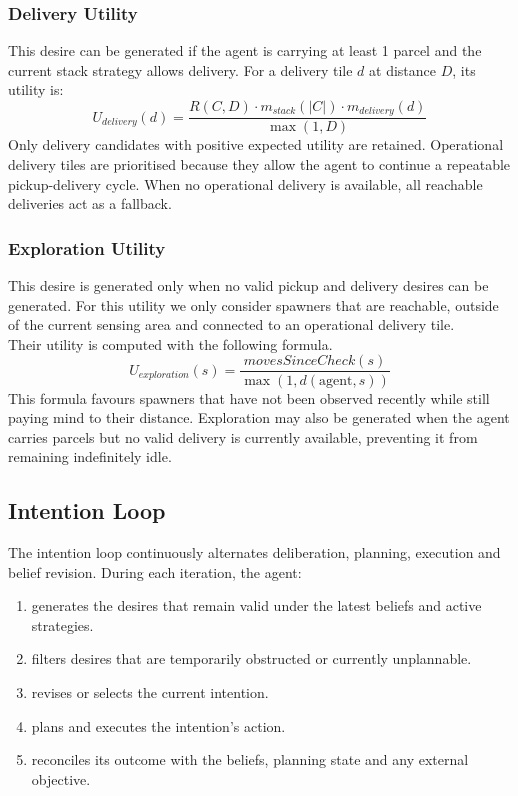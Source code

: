 \documentclass[11pt,a4paper]{article}
\begin{document}
\subsubsection{Delivery Utility}
This desire can be generated if the agent is carrying at least 1 parcel and the current stack strategy allows delivery.
For a delivery tile $d$ at distance $D$, its utility is:
\begin{equation*}
    U_{delivery}(d) = \frac{R(C,D) \cdot m_{stack}(\lvert C \rvert) \cdot m_{delivery}(d)}{\max(1,D)}
\end{equation*}
Only delivery candidates with positive expected utility are retained. 
Operational delivery tiles are prioritised because they allow the agent to continue a repeatable pickup-delivery cycle.
When no operational delivery is available, all reachable deliveries act as a fallback.

\subsubsection{Exploration Utility}
This desire is generated only when no valid pickup and delivery desires can be generated.
For this utility we only consider spawners that are reachable, outside of the current sensing area and connected to an operational delivery tile.
\\Their utility is computed with the following formula.
\begin{equation*}
    U_{exploration}(s) = \frac{movesSinceCheck(s)}{\max(1,d(\text{agent},s))}
\end{equation*}
This formula favours spawners that have not been observed recently while still paying mind to their distance. 
Exploration may also be generated when the agent carries parcels but no valid delivery is currently available, preventing it from remaining indefinitely idle.

\subsection{Intention Loop}
The intention loop continuously alternates deliberation, planning, execution and belief revision.
During each iteration, the agent:
\begin{enumerate}
    \item generates the desires that remain valid under the latest beliefs and active strategies.
    \item filters desires that are temporarily obstructed or currently unplannable.
    \item revises or selects the current intention.
    \item plans and executes the intention's action.
    \item reconciles its outcome with the beliefs, planning state and any external objective.
\end{enumerate}
\end{document}

